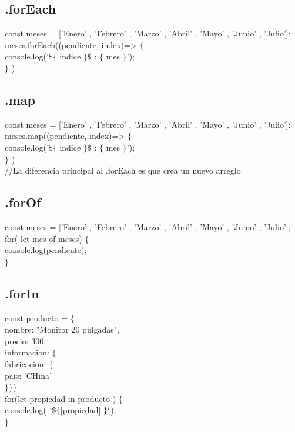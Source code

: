 \documentclass[10pt,a4paper]{article}
\begin{document}
\subsection{.forEach} 
const meses = ['Enero' , 'Febrero' , 'Marzo' , 'Abril' , 'Mayo' , 'Junio' , 'Julio']; \\
meses.forEach((pendiente, index)=> $ \{ $ \\
    console.log('$ \$ \{$ indice  $\} \$  $ : $\{$ mes $ \} $');\\
$ \} $ )\\

\subsection{.map} 
const meses = ['Enero' , 'Febrero' , 'Marzo' , 'Abril' , 'Mayo' , 'Junio' , 'Julio']; \\
meses.map((pendiente, index)=> $ \{ $ \\
    console.log('$ \$ \{$ indice  $\} \$  $ : $\{$ mes $ \} $');\\
$ \} $ )\\
//La diferencia principal al .forEach es que crea un nuevo arreglo\\

\subsection{.forOf} 
const meses = ['Enero' , 'Febrero' , 'Marzo' , 'Abril' , 'Mayo' , 'Junio' , 'Julio']; \\
for( let mes of meses) $ \{ $ \\
console.log(pendiente); \\
$ \} $
\subsection{.forIn} 
const producto = $ \{ $ \\ nombre: "Monitor 20 pulgadas", \\ precio: 300, \\ informacion: $ \{ $ \\
fabricacion:  $ \{ $ \\ pais: 'CHina' \\ $ \} \} \}$  \\
for(let propiedad in producto ) $ \{ $ \\
console.log( $` \$ \{ $[propiedad] $ \} `$); \\
$ \} $\\
\end{document}
